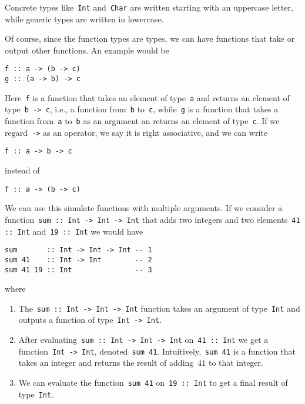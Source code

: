 \documentclass[a4paper]{article}
\theoremstyle{plain}
\theoremstyle{definition}
\newcommand{\ie}{{i}.{e}., }
\begin{document}
Concrete types like~\texttt{Int} and~\texttt{Char} are
written starting with an uppercase letter, while generic types are written in
lowercase.

Of course, since the function types are types, we can have functions that take
or output other functions. An example would be
\begin{verbatim}
f :: a -> (b -> c)
g :: (a -> b) -> c
\end{verbatim}
Here~\texttt{f} is a function that takes an element of
type~\texttt{a} and returns an element of
type~\texttt{b -> c}, \ie a function from~\texttt{b}
to~\texttt{c}, while~\texttt{g} is a function that
takes a function from~\texttt{a} to~\texttt{b} as an
argument an returns an element of type~\texttt{c}. If we
regard~\texttt{->} as an operator, we say it is right associative,
and we can write
\begin{verbatim}
f :: a -> b -> c
\end{verbatim}
instead of
\begin{verbatim}
f :: a -> (b -> c)
\end{verbatim}

We can use this simulate functions with multiple arguments.
If we consider a function~\texttt{sum :: Int -> Int -> Int} that
adds two integers and two elements~\texttt{41 :: Int}
and~\texttt{19 :: Int} we would have
\begin{verbatim}
sum       :: Int -> Int -> Int -- 1
sum 41    :: Int -> Int        -- 2
sum 41 19 :: Int               -- 3
\end{verbatim}
where
\begin{enumerate}
    \item The~\texttt{sum :: Int -> Int -> Int} function takes an
        argument of type~\texttt{Int} and outputs a function of
        type~\texttt{Int -> Int}.
    \item After evaluating~\texttt{sum :: Int -> Int -> Int}
        on~\texttt{41 :: Int} we get a
        function~\texttt{Int -> Int},
        denoted~\texttt{sum 41}.
        Intuitively,~\texttt{sum 41} is a function that takes an
        integer and returns the result of adding~\(41\) to that integer.
    \item We can evaluate the function~\texttt{sum 41}
        on~\texttt{19 :: Int} to get a final result of
        type~\texttt{Int}.
\end{enumerate}
\end{document}
